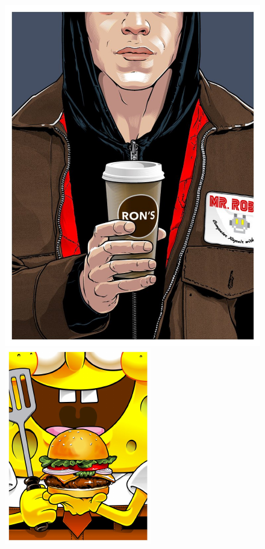 \documentclass[12pt, a4paper]{article}
\begin{document}
\begin{figure}[h!]
\begin{minipage}[h!]{0.28\linewidth}
\includegraphics[scale=0.018]{pop5.pdf}
\end{minipage}
\hfill
\begin{minipage}[h!]{0.28\linewidth} 
\includegraphics[scale=1.18]{pop8.pdf}

\end{minipage}
\end{figure}
\end{document}
